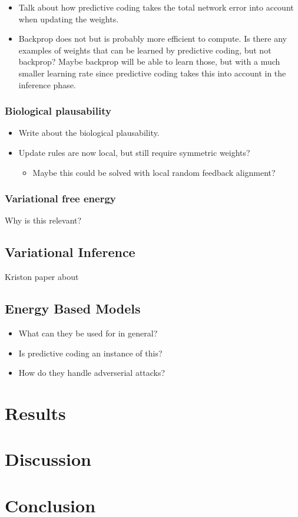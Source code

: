 \documentclass[a4paper,11pt]{article} %
\begin{document}
\begin{itemize}
  \item Talk about how predictive coding takes the total network error into account when updating the weights. 
  \item Backprop does not but is probably more efficient to compute. Is there any examples of weights that can be learned by predictive coding, but not backprop? Maybe backprop will be able to learn those, but with a much smaller learning rate since predictive coding takes this into account in the inference phase. 
\end{itemize}

\subsubsection{Biological plausability}
\begin{itemize}
  \item Write about the biological plausability.
  \item Update rules are now local, but still require symmetric weights? \begin{itemize}
    \item Maybe this could be solved with local random feedback alignment?
  \end{itemize}
\end{itemize}

\subsubsection{Variational free energy}
Why is this relevant?

\subsection{Variational Inference}
Kriston paper about 

\subsection{Energy Based Models}
\begin{itemize}
  \item What can they be used for in general?
  \item Is predictive coding an instance of this?
  \item How do they handle adverserial attacks?
\end{itemize}

\section{Results}

\section{Discussion}

\section{Conclusion}
\newpage


\end{document}
